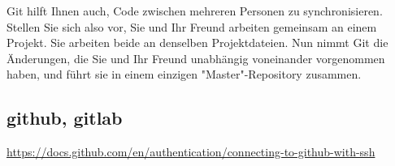 Git hilft Ihnen auch, Code zwischen mehreren Personen zu synchronisieren. Stellen Sie sich also vor, Sie und Ihr Freund arbeiten gemeinsam an einem Projekt. Sie arbeiten beide an denselben Projektdateien. Nun nimmt Git die Änderungen, die Sie und Ihr Freund unabhängig voneinander vorgenommen haben, und führt sie in einem einzigen "Master"-Repository zusammen.\\


\subsection{github, gitlab}
\url{https://docs.github.com/en/authentication/connecting-to-github-with-ssh}